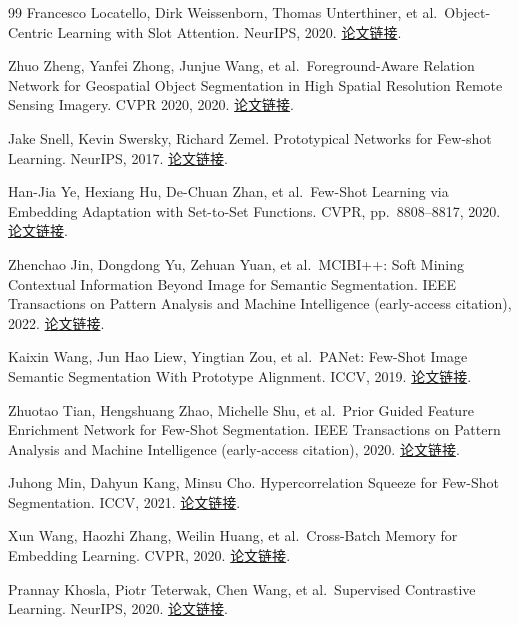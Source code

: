 \documentclass[UTF8,a4paper,zihao=-4,fontset=none]{ctexart}
\begin{document}
\begin{thebibliography}{99}
Francesco Locatello, Dirk Weissenborn, Thomas Unterthiner, et al.~Object-Centric Learning with Slot Attention. NeurIPS, 2020. \href{https://arxiv.org/abs/2006.15055}{论文链接}.

Zhuo Zheng, Yanfei Zhong, Junjue Wang, et al.~Foreground-Aware Relation Network for Geospatial Object Segmentation in High Spatial Resolution Remote Sensing Imagery. CVPR 2020, 2020. \href{https://openaccess.thecvf.com/content_CVPR_2020/html/Zheng_Foreground-Aware_Relation_Network_for_Geospatial_Object_Segmentation_in_High_Spatial_CVPR_2020_paper.html}{论文链接}.

Jake Snell, Kevin Swersky, Richard Zemel. Prototypical Networks for Few-shot Learning. NeurIPS, 2017. \href{https://papers.nips.cc/paper/6996-prototypical-networks-for-few-shot-learning}{论文链接}.

Han-Jia Ye, Hexiang Hu, De-Chuan Zhan, et al.~Few-Shot Learning via Embedding Adaptation with Set-to-Set Functions. CVPR, pp.~8808--8817, 2020. \href{https://arxiv.org/abs/1812.03664}{论文链接}.

Zhenchao Jin, Dongdong Yu, Zehuan Yuan, et al.~MCIBI++: Soft Mining Contextual Information Beyond Image for Semantic Segmentation. IEEE Transactions on Pattern Analysis and Machine Intelligence (early-access citation), 2022. \href{https://arxiv.org/abs/2209.04471}{论文链接}.

Kaixin Wang, Jun Hao Liew, Yingtian Zou, et al.~PANet: Few-Shot Image Semantic Segmentation With Prototype Alignment. ICCV, 2019. \href{https://arxiv.org/abs/1908.06391}{论文链接}.

Zhuotao Tian, Hengshuang Zhao, Michelle Shu, et al.~Prior Guided Feature Enrichment Network for Few-Shot Segmentation. IEEE Transactions on Pattern Analysis and Machine Intelligence (early-access citation), 2020. \href{https://arxiv.org/abs/2008.01449}{论文链接}.

Juhong Min, Dahyun Kang, Minsu Cho. Hypercorrelation Squeeze for Few-Shot Segmentation. ICCV, 2021. \href{https://arxiv.org/abs/2104.01538}{论文链接}.

Xun Wang, Haozhi Zhang, Weilin Huang, et al.~Cross-Batch Memory for Embedding Learning. CVPR, 2020. \href{https://arxiv.org/abs/1912.06798}{论文链接}.

Prannay Khosla, Piotr Teterwak, Chen Wang, et al.~Supervised Contrastive Learning. NeurIPS, 2020. \href{https://arxiv.org/abs/2004.11362}{论文链接}.


\end{thebibliography}
\end{document}
